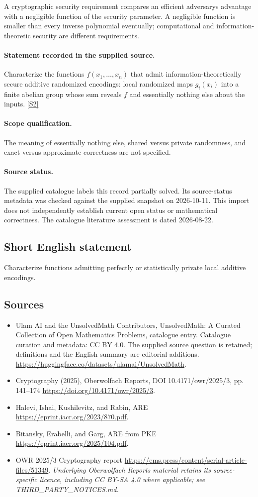 \documentclass[11pt]{article}
\begin{document}
A cryptographic security requirement compares an efficient adversary\textquotesingle s advantage with a negligible function of the security parameter. A negligible function is smaller than every inverse polynomial eventually; computational and information-theoretic security are different requirements.
\paragraph{Statement recorded in the supplied source.}
Characterize the functions $f(x_1,\ldots,x_n)$ that admit information-theoretically secure additive randomized encodings: local randomized maps $g_i(x_i)$ into a finite abelian group whose sum reveals $f$ and essentially nothing else about the inputs. \href{https://doi.org/10.4171/owr/2025/3}{[S2]}
\paragraph{Scope qualification.}
The meaning of essentially nothing else, shared versus private randomness, and exact versus approximate correctness are not specified.
\paragraph{Source status.}
The supplied catalogue labels this record partially solved. Its source-status metadata was checked against the supplied snapshot on 2026-10-11. This import does not independently establish current open status or mathematical correctness. The catalogue literature assessment is dated 2026-08-22.
\subsection{Short English statement}
Characterize functions admitting perfectly or statistically private local additive encodings.
\subsection{Sources}
\begin{itemize}
\item[S1] Ulam AI and the UnsolvedMath Contributors, UnsolvedMath: A Curated Collection of Open Mathematics Problems, catalogue entry. Catalogue curation and metadata: CC BY 4.0. The supplied source question is retained; definitions and the English summary are editorial additions.
\url{https://huggingface.co/datasets/ulamai/UnsolvedMath}.
\item[S2] Cryptography (2025), Oberwolfach Reports, DOI 10.4171/owr/2025/3, pp. 141--174
\url{https://doi.org/10.4171/owr/2025/3}.
\item[S3] Halevi, Ishai, Kushilevitz, and Rabin, ARE
\url{https://eprint.iacr.org/2023/870.pdf}.
\item[S4] Bitansky, Erabelli, and Garg, ARE from PKE
\url{https://eprint.iacr.org/2025/104.pdf}.
\item[S5] OWR 2025/3 Cryptography report
\url{https://ems.press/content/serial-article-files/51349}.
\textit{Underlying Oberwolfach Reports material retains its source-specific licence, including CC BY-SA 4.0 where applicable; see THIRD\_PARTY\_NOTICES.md.}
\end{itemize}
\end{document}
